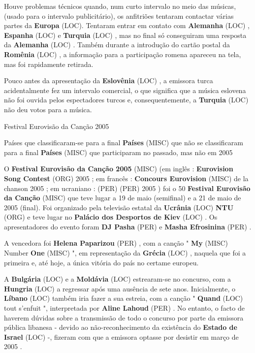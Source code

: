 \documentclass[12pt,a4paper]{article}
\begin{document}
Houve problemas técnicos quando, num curto intervalo no meio das músicas, (usado para o intervalo publicitário), os anfitriões tentaram contactar várias partes da \textbf{Europa} (LOC). Tentaram entrar em contato com \textbf{Alemanha} (LOC) , \textbf{Espanha} (LOC) e \textbf{Turquia} (LOC) , mas no final só conseguiram uma resposta da \textbf{Alemanha} (LOC) . Também durante a introdução do cartão postal da \textbf{Romênia} (LOC) , a informação para a participação romena apareceu na tela, mas foi rapidamente retirada.

Pouco antes da apresentação da \textbf{Eslovênia} (LOC) , a emissora turca acidentalmente fez um intervalo comercial, o que significa que a música eslovena não foi ouvida pelos espectadores turcos e, consequentemente, a \textbf{Turquia} (LOC) não deu votos para a música.



Festival Eurovisão da Canção 2005



Países que classificaram-se para a final \textbf{Países} (MISC) que não se classificaram para a final \textbf{Países} (MISC) que participaram no passado, mas não em 2005

O \textbf{Festival Eurovisão da Canção 2005} (MISC) (em inglês : \textbf{Eurovision Song Contest} (ORG) 2005 ; em francês : \textbf{Concours Eurovision} (MISC) de la chanson 2005 ; em ucraniano : \textbf{} (PER)  \textbf{} (PER) 2005 ) foi o 50 \textbf{Festival Eurovisão da Canção} (MISC) que teve lugar a 19 de maio (semifinal) e a 21 de maio de 2005 (final). Foi organizado pela televisão estatal da \textbf{Ucrânia} (LOC) \textbf{NTU} (ORG) e teve lugar no \textbf{Palácio dos Desportos de Kiev} (LOC) . Os apresentadores do evento foram \textbf{DJ Pasha} (PER) e \textbf{Masha Efrosinina} (PER) .

A vencedora foi \textbf{Helena Paparizou} (PER) , com a canção " \textbf{My} (MISC) Number \textbf{One} (MISC) ", em representação da \textbf{Grécia} (LOC) , naquela que foi a primeira e, até hoje, a única vitória do país no certame europeu.

A \textbf{Bulgária} (LOC) e a \textbf{Moldávia} (LOC) estrearam-se no concurso, com a \textbf{Hungria} (LOC) a regressar após uma ausência de sete anos. Inicialmente, o \textbf{Líbano} (LOC) também iria fazer a sua estreia, com a canção " \textbf{Quand} (LOC) tout s'enfuit ", interpretada por \textbf{Aline Lahoud} (PER) . No entanto, o facto de haverem dúvidas sobre a transmissão de todo o concurso por parte da emissora pública libanesa - devido ao não-reconhecimento da existência do \textbf{Estado de Israel} (LOC) -, fizeram com que a emissora optasse por desistir em março de 2005 .
\end{document}
